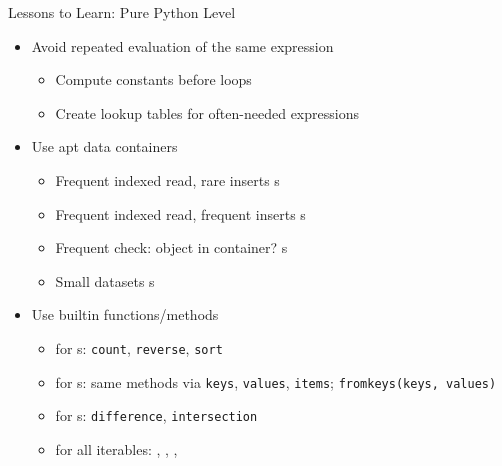 \begin{frame}{Lessons to Learn: Pure Python Level}
%
\begin{itemize}
\item Avoid repeated evaluation of the same expression
	\begin{itemize}
	\item Compute constants before loops
	\item Create lookup tables for often-needed expressions
	\end{itemize}
\item Use apt data containers
	\begin{itemize}
	\item Frequent indexed read, rare inserts \Thus {}s
	\item Frequent indexed read, frequent inserts \Thus {}s
	\item Frequent check: object in container? \Thus {}s
	\item Small datasets \Thus {}s
	\end{itemize}
\item Use builtin functions/methods
	\begin{itemize}
	\item for s: \texttt{count}, \texttt{reverse}, \texttt{sort}
	\item for s: same methods via \texttt{keys}, \texttt{values}, \texttt{items}; \texttt{fromkeys(keys, values)}
	\item for s: \texttt{difference}, \texttt{intersection}
	\item for all iterables: , , , 
	\end{itemize}
\end{itemize}
%
\end{frame}


